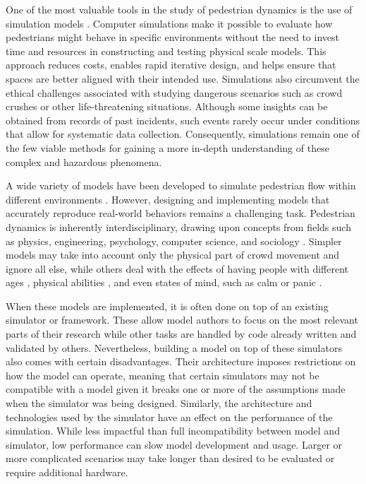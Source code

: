 \documentclass[twoside, 11pt]{article}
\begin{document}
One of the most valuable tools in the study of pedestrian dynamics is the use of simulation models \cite{8718399}. Computer simulations make it possible to evaluate how pedestrians might behave in specific environments without the need to invest time and resources in constructing and testing physical scale models. This approach reduces costs, enables rapid iterative design, and helps ensure that spaces are better aligned with their intended use. Simulations also circumvent the ethical challenges associated with studying dangerous scenarios such as crowd crushes or other life-threatening situations. Although some insights can be obtained from records of past incidents, such events rarely occur under conditions that allow for systematic data collection. Consequently, simulations remain one of the few viable methods for gaining a more in-depth understanding of these complex and hazardous phenomena.

A wide variety of models have been developed to simulate pedestrian flow within different environments \cite{kouskoulisSystematicReviewPedestrian2017}. However, designing and implementing models that accurately reproduce real-world behaviors remains a challenging task. Pedestrian dynamics is inherently interdisciplinary, drawing upon concepts from fields such as physics, engineering, psychology, computer science, and sociology \cite{kleinmeierVadereOpenSourceSimulation2019}. Simpler models may take into account only the physical part of crowd movement and ignore all else, while others deal with the effects of having people with different ages \cite{gorriniAgeGroupdrivenPedestrian2016}, physical abilities \cite{fuExperimentalStudyBidirectional2022}, and even states of mind, such as calm or panic \cite{Alrashed_Shamma_2020}.


When these models are implemented, it is often done on top of an existing simulator or framework. These allow model authors to focus on the most relevant parts of their research while other tasks are handled by code already written and validated by others. Nevertheless, building a model on top of these simulators also comes with certain disadvantages. Their architecture imposes restrictions on how the model can operate, meaning that certain simulators may not be compatible with a model given it breaks one or more of the assumptions made when the simulator was being designed. Similarly, the architecture and technologies used by the simulator have an effect on the performance of the simulation. While less impactful than full incompatibility between model and simulator, low performance can slow model development and usage. Larger or more complicated scenarios may take longer than desired to be evaluated or require additional hardware.
\end{document}
